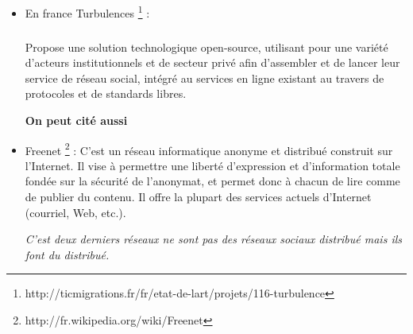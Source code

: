 \begin{itemize}
1) Tent vous permet de sauvegarder vos données dans une place dont vous avez le contrôle. 

2) Vous pouvez choisir un fournisseur d'hébergement ou lancer votre propre serveur.

3) Si vous souhaitez déplacer les hosts vous aurez vos données et relations.
\begin{itemize}
  \item tent utilise https et JSON pour transporter les posts entre les serveurs et les apps.
\item les entités sont les utilisateurs de tant il autorisent apps, établi des relations et lire/publier des posts les entités sont définie avec leur entité URL; https/http URL liée les métadata
\item chaque entité a 1 ou plusieurs serveur qui la représente.
\item posts sont les atomics unité de contenu dans tent chaque post est un JSON, ils ont des fichiers attacher.
\item APPS fourni des UI (user interface) pour tent.
\item tent c'est une machine readable JSON api les apps doivent être autorisée avec oauth2
\item relationShips : les entités établissent des relations lorsque il envoient des messages qui mentionnent d'autres entités. 

\end{itemize}
\subparagraph{}
Les fonctionnalités trouvées aussi sur les sites d'information communautaires comme \textit{hacker news} \footnote{http://thehackernews.com/} peuvent être reproduite avec tent, mais nécessairement architecturée d'une manière différente. les messages et les commentaires sont situé sur le serveur tent au lieu d'être regroupé sur un site unique ou base de donnée. 
\subparagraph{}
Les données sont stockées dans tent comme messages. Messages, comme les fichiers, sont tapés. Il ya un petit nombre de types de poste prévues par le protocole que les serveurs utilisent des tentes. Les développeurs sont libres de créer de nouveaux types de poste pour le contenu / stockage de données.

  \item En france Turbulences \footnote{http://ticmigrations.fr/fr/etat-de-lart/projets/116-turbulence} :
\subparagraph{}
 Propose une solution technologique open-source, utilisant pour une variété d'acteurs institutionnels et de secteur privé afin d'assembler et de lancer leur service de réseau social, intégré au services en ligne existant au travers de protocoles et de standards libres.

\textbf{On peut cité aussi }
\item Freenet \footnote{http://fr.wikipedia.org/wiki/Freenet} : C'est un réseau informatique anonyme et distribué construit sur l'Internet. Il vise à permettre une liberté d'expression et d'information totale fondée sur la sécurité de l'anonymat, et permet donc à chacun de lire comme de publier du contenu. Il offre la plupart des services actuels d'Internet (courriel, Web, etc.). 

\textit{C'est deux derniers réseaux ne sont pas des réseaux sociaux distribué mais ils font du distribué. }
\end{itemize}
